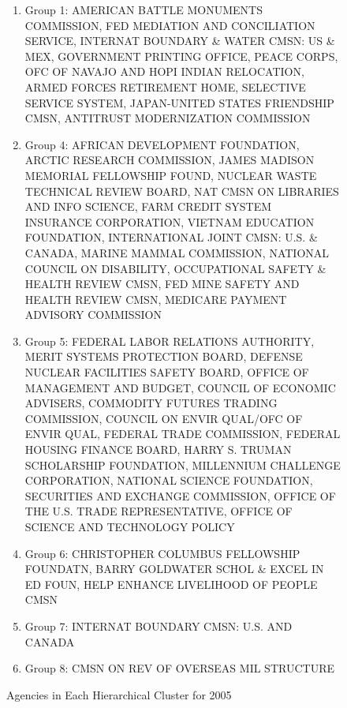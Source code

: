 \documentclass{article}
\begin{document}
    \begin{center}
        \begin{figure}
            \begin{enumerate}
                \item Group 1: AMERICAN BATTLE MONUMENTS COMMISSION, FED MEDIATION AND CONCILIATION SERVICE, INTERNAT BOUNDARY \& WATER CMSN: US \& MEX, GOVERNMENT PRINTING OFFICE, PEACE CORPS, OFC OF NAVAJO AND HOPI INDIAN RELOCATION, ARMED FORCES RETIREMENT HOME, SELECTIVE SERVICE SYSTEM, JAPAN-UNITED STATES FRIENDSHIP CMSN, ANTITRUST MODERNIZATION COMMISSION
                \item Group 4: AFRICAN DEVELOPMENT FOUNDATION, ARCTIC RESEARCH COMMISSION, JAMES MADISON MEMORIAL FELLOWSHIP FOUND, NUCLEAR WASTE TECHNICAL REVIEW BOARD, NAT CMSN ON LIBRARIES AND INFO SCIENCE, FARM CREDIT SYSTEM INSURANCE CORPORATION, VIETNAM EDUCATION FOUNDATION, INTERNATIONAL JOINT CMSN: U.S. \& CANADA, MARINE MAMMAL COMMISSION, NATIONAL COUNCIL ON DISABILITY, OCCUPATIONAL SAFETY \& HEALTH REVIEW CMSN, FED MINE SAFETY AND HEALTH REVIEW CMSN, MEDICARE PAYMENT ADVISORY COMMISSION
                \item Group 5: FEDERAL LABOR RELATIONS AUTHORITY, MERIT SYSTEMS PROTECTION BOARD, DEFENSE NUCLEAR FACILITIES SAFETY BOARD, OFFICE OF MANAGEMENT AND BUDGET, COUNCIL OF ECONOMIC ADVISERS, COMMODITY FUTURES TRADING COMMISSION, COUNCIL ON ENVIR QUAL/OFC OF ENVIR QUAL, FEDERAL TRADE COMMISSION, FEDERAL HOUSING FINANCE BOARD, HARRY S. TRUMAN SCHOLARSHIP FOUNDATION, MILLENNIUM CHALLENGE CORPORATION, NATIONAL SCIENCE FOUNDATION, SECURITIES AND EXCHANGE COMMISSION, OFFICE OF THE U.S. TRADE REPRESENTATIVE, OFFICE OF SCIENCE AND TECHNOLOGY POLICY
                \item Group 6: CHRISTOPHER COLUMBUS FELLOWSHIP FOUNDATN, BARRY GOLDWATER SCHOL \& EXCEL IN ED FOUN, HELP ENHANCE LIVELIHOOD OF PEOPLE CMSN
                \item Group 7: INTERNAT BOUNDARY CMSN: U.S. AND CANADA
                \item Group 8: CMSN ON REV OF OVERSEAS MIL STRUCTURE
            \end{enumerate}
            \caption{Agencies in Each Hierarchical Cluster for 2005}
            \label{tab:3}
        \end{figure}
    \end{center}
\end{document}
